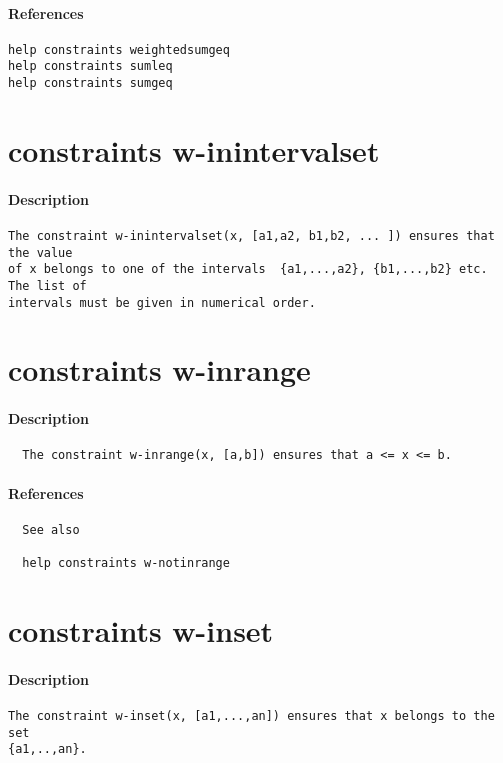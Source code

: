 \paragraph{References}
{\footnotesize
\begin{verbatim}
help constraints weightedsumgeq
help constraints sumleq
help constraints sumgeq
\end{verbatim}
}
\section{constraints w-inintervalset}
\paragraph{Description}
{\footnotesize
\begin{verbatim}
The constraint w-inintervalset(x, [a1,a2, b1,b2, ... ]) ensures that the value
of x belongs to one of the intervals  {a1,...,a2}, {b1,...,b2} etc. The list of
intervals must be given in numerical order.
\end{verbatim}
}
\section{constraints w-inrange}
\paragraph{Description}
{\footnotesize
\begin{verbatim}
  The constraint w-inrange(x, [a,b]) ensures that a <= x <= b.
\end{verbatim}
}
\paragraph{References}
{\footnotesize
\begin{verbatim}
  See also

  help constraints w-notinrange
\end{verbatim}
}
\section{constraints w-inset}
\paragraph{Description}
{\footnotesize
\begin{verbatim}
The constraint w-inset(x, [a1,...,an]) ensures that x belongs to the set
{a1,..,an}.
\end{verbatim}
}

